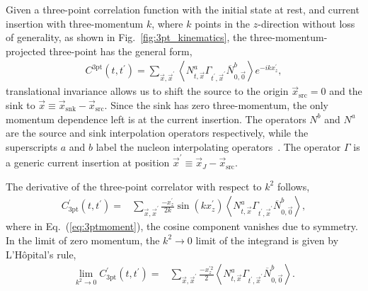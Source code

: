 \documentclass{PoS}
\begin{document}
Given a three-point correlation function with the initial state at rest, and current insertion with three-momentum $k$, where $k$ points in the $z$-direction without loss of generality, as shown in Fig.~\ref{fig:3pt_kinematics}, the three-momentum-projected three-point has the general form,
\begin{align}
C^{\text{3pt}}(t, t^\prime) = \sum_{\vec{x},\vec{x}^\prime} \left<N^a_{t,\vec{x}}\Gamma_{t^\prime,\vec{x}^\prime} \overline{N}^b_{0,\vec{0}}\right> e^{-ikx^\prime_z},
\label{eq:3pt}
\end{align}
translational invariance allows us to shift the source to the origin $\vec{x}_{\text{src}} = 0$ and the sink to $\vec{x}\equiv \vec{x}_{\text{snk}} - \vec{x}_{\text{src}}$. Since the sink has zero three-momentum, the only momentum dependence left is at the current insertion. The operators $N^b$ and $N^a$ are the source and sink interpolation operators respectively, while the superscripts $a$ and $b$ label the nucleon interpolating operators~\cite{Basak:2005ir,Basak:2007kj}. The operator $\Gamma$ is a generic current insertion at position $\vec{x}^\prime\equiv \vec{x}_J-\vec{x}_{\text{src}}$.

The derivative of the three-point correlator with respect to $k^2$ follows,
\begin{align}
C^\prime_{\text{3pt}}(t, t^\prime)
=& \sum_{\vec{x},\vec{x}^\prime} \frac{-x^\prime_z}{2k}\sin\left(kx^\prime_z\right) \left<N^a_{t,\vec{x}}\Gamma_{t^\prime,\vec{x}^\prime} \overline{N}^b_{0,\vec{0}}\right>, 
\label{eq:3ptmoment}
\end{align}
where in Eq.~(\ref{eq:3ptmoment}), the cosine component vanishes due to symmetry. %
In the limit of zero momentum, the $k^2 \rightarrow 0$ limit of the integrand is given by L'H\^opital's rule,
\begin{align}
\lim_{k^2 \rightarrow 0} C^\prime_{\text{3pt}}(t, t^\prime) = & \sum_{\vec{x},\vec{x}^\prime}\frac{-x^{\prime 2}_z}{2}\left<N^a_{t,\vec{x}}\Gamma_{t^\prime,\vec{x}^\prime} \overline{N}^b_{0,\vec{0}}\right>.
\label{eq:3ptmoment0}
\end{align}

\end{document}
